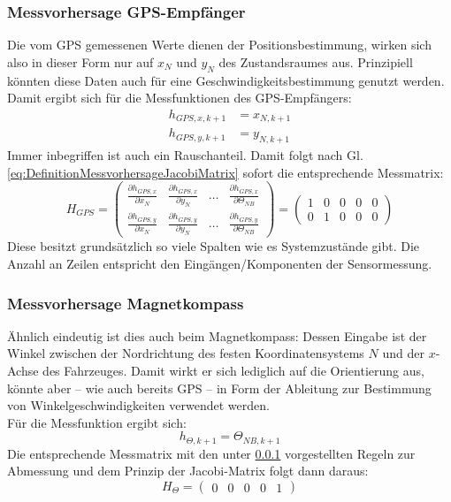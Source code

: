 \documentclass[12pt,a4paper]{article}
\newcommand{\PA}[2]{\frac{\partial #1}{\partial #2}}
\begin{document}
	\subsubsection{Messvorhersage GPS-Empfänger}\label{subsubsec:MessvorhersageGPS}
	Die vom GPS gemessenen Werte dienen der Positionsbestimmung, wirken sich also in dieser Form nur auf $x_{N}$ und $y_{N}$ des Zustandsraumes aus. Prinzipiell könnten diese Daten auch für eine Geschwindigkeitsbestimmung genutzt werden.
	Damit ergibt sich für die Messfunktionen des GPS-Empfängers:
	\begin{align}
		h_{GPS,x,k+1}&=x_{N,k+1}\\
		h_{GPS,y,k+1}&=y_{N,k+1}
	\end{align}
	Immer inbegriffen ist auch ein Rauschanteil. Damit folgt nach Gl. \ref{eq:DefinitionMessvorhersageJacobiMatrix} sofort die entsprechende Messmatrix:
	\begin{equation}
		H_{GPS}=\begin{pmatrix}
		\PA{h_{GPS,x}}{x_{N}} & \PA{h_{GPS,x}}{y_{N}} & \ldots & \PA{h_{GPS,x}}{\Theta_{NB}}\\[0.5em]
		\PA{h_{GPS,y}}{x_{N}} & \PA{h_{GPS,y}}{y_{N}} & \ldots & \PA{h_{GPS,y}}{\Theta_{NB}}
		\end{pmatrix}=
		\begin{pmatrix}
		1 & 0 & 0 & 0 & 0 \\[0.5em]
		0 & 1 & 0 & 0 & 0
		\end{pmatrix}			
	\end{equation}
	Diese besitzt grundsätzlich so viele Spalten wie es Systemzustände gibt. Die Anzahl an Zeilen entspricht den Eingängen/Komponenten der Sensormessung.
	\subsubsection{Messvorhersage Magnetkompass}\label{subsubsec:MessvorhersageMagnetkompass}
	Ähnlich eindeutig ist dies auch beim Magnetkompass: Dessen Eingabe ist der Winkel zwischen der Nordrichtung des festen Koordinatensystems $N$ und der $x$-Achse des Fahrzeuges. Damit wirkt er sich lediglich auf die Orientierung aus, könnte aber -- wie auch bereits GPS -- in Form der Ableitung zur Bestimmung von Winkelgeschwindigkeiten verwendet werden.\\
	Für die Messfunktion ergibt sich:
	\begin{equation}
		h_{\Theta,k+1}=\Theta_{NB,k+1}
	\end{equation}
	Die entsprechende Messmatrix mit den unter \ref{subsubsec:MessvorhersageGPS} vorgestellten Regeln zur Abmessung und dem Prinzip der Jacobi-Matrix folgt dann daraus:
	\begin{equation}
		H_{\Theta}=\begin{pmatrix}
		0 & 0 & 0 & 0 & 1
		\end{pmatrix}		
	\end{equation}
\end{document}

